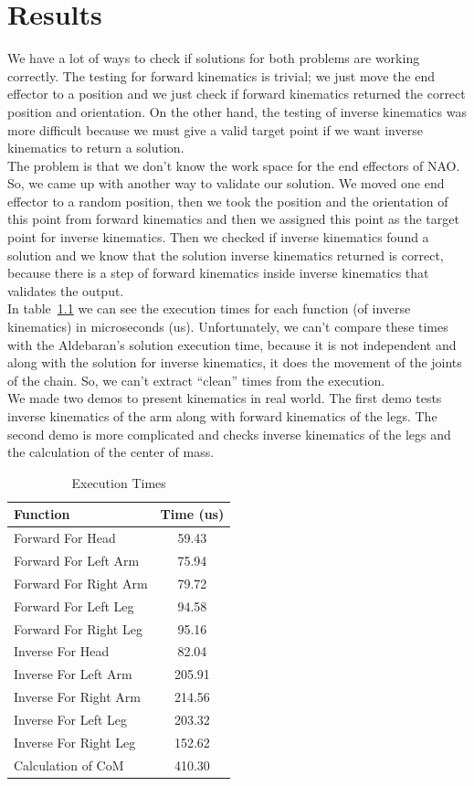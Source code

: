 \chapter{Results}
\label{Results}
We have a lot of ways to check if solutions for both problems are working correctly. The testing for forward kinematics is trivial; we just move the end effector to a position and we just check if forward kinematics returned the correct position and orientation. On the other hand, the testing of inverse kinematics was more difficult because we must give a valid target point if we want inverse kinematics to return a solution.\\
The problem is that we don't know the work space for the end effectors of NAO. So, we came up with another way to validate our solution. We moved one end effector to a random position, then we took the position and the orientation of this point from forward kinematics and then we assigned this point as the target point for inverse kinematics. Then we checked if inverse kinematics found a solution and we know that the solution inverse kinematics returned is correct, because there is a step of forward kinematics inside inverse kinematics that validates the output.\\
In table~\ref{times} we can see the execution times for each function (of inverse kinematics) in microseconds (us). Unfortunately, we can't compare these times with the Aldebaran's solution execution time, because it is not independent and along with the solution for inverse kinematics, it does the movement of the joints of the chain. So, we can't extract ``clean'' times from the execution.\\
We made two demos to present kinematics in real world. The first demo tests inverse kinematics of the arm along with forward kinematics of the legs. The second demo is more complicated and checks inverse kinematics of the legs and the calculation of the center of mass.\\
\begin{table}[!h]
\centering
\caption{Execution Times}
\vspace*{0.06cm}
\begin{tabular}{|l|c|}
\hline
\textbf{Function} & \textbf{Time (us)}\\ \hline
Forward For Head & 59.43 \\
Forward For Left Arm & 75.94 \\
Forward For Right Arm & 79.72 \\
Forward For Left Leg & 94.58 \\
Forward For Right Leg & 95.16 \\
Inverse For Head & 82.04 \\
Inverse For Left Arm & 205.91 \\
Inverse For Right Arm & 214.56 \\
Inverse For Left Leg & 203.32 \\
Inverse For Right Leg & 152.62 \\
Calculation of CoM & 410.30 \\
\hline
\end{tabular}
\label{times}
\end{table}
